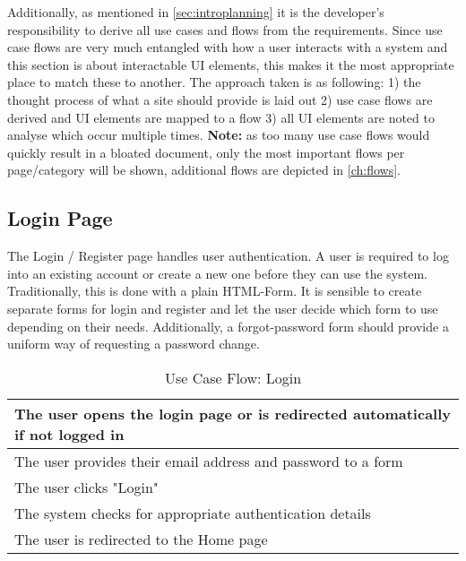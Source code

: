 Additionally, as mentioned in \autoref{sec:introplanning} it is the developer's responsibility to derive all use cases and flows from the requirements. Since use case flows are very much entangled with how a user interacts with a system and this section is about interactable UI elements, this makes it the most appropriate place to match these to another.  The approach taken is as following: 1) the thought process of what a site should provide is laid out 2) use case flows are derived and UI elements are mapped to a flow 3) all UI elements are noted to analyse which occur multiple times. \textbf{Note:} as too many use case flows would quickly result in a bloated document, only the most important flows per page/category will be shown, additional flows are depicted in \autoref{ch:flows}. 

\subsection{Login Page}
The Login / Register page handles user authentication. A user is required to log into an existing account or create a new one before they can use the system. Traditionally, this is done with a plain HTML-Form. It is sensible to create separate forms for login and register and let the user decide which form to use depending on their needs. Additionally, a forgot-password form should provide a uniform way of requesting a password change. \newline

\begin{table}[H]
  \begin{tabularx}{\linewidth}{|X|}
    \hline
     The user opens the login page or is redirected automatically if not logged in \\
     \hline
     The user provides their email address and password to a form \\
     \hline
     The user clicks "Login" \\
     \hline
     The system checks for appropriate authentication details \\
     \hline
     The user is redirected to the Home page \\
     \hline 
  \end{tabularx}
  \caption{Use Case Flow: Login}
\end{table}

